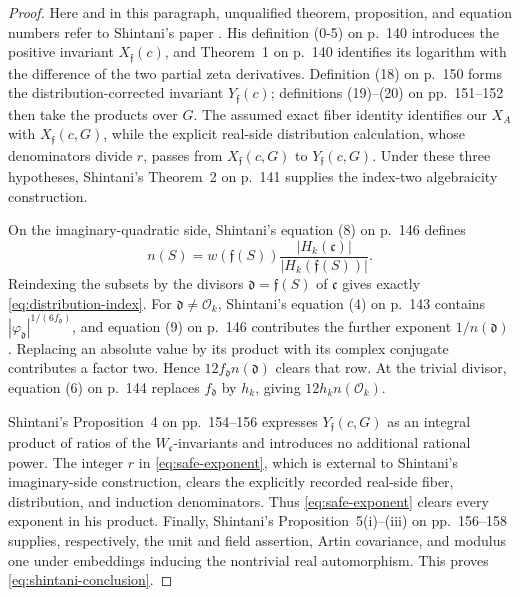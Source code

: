 \documentclass[11pt]{article}
\begin{document}
\begin{proof}
Here and in this paragraph, unqualified theorem, proposition, and
equation numbers refer to Shintani's paper \cite{Shintani1978}.
His definition (0-5) on p.~140 introduces the positive invariant
\(X_{\mathfrak f}(c)\), and Theorem~1 on p.~140 identifies its
logarithm with the difference of the two partial zeta derivatives.
Definition (18) on p.~150 forms the distribution-corrected invariant
\(Y_{\mathfrak f}(c)\); definitions (19)--(20) on pp.~151--152 then
take the products over \(G\).  The assumed exact fiber identity
identifies our \(X_A\) with \(X_{\mathfrak f}(c,G)\), while the
explicit real-side distribution calculation, whose denominators
divide \(r\), passes from \(X_{\mathfrak f}(c,G)\) to
\(Y_{\mathfrak f}(c,G)\).  Under these three hypotheses,
Shintani's Theorem~2 on p.~141 supplies the index-two algebraicity
construction.

On the imaginary-quadratic side, Shintani's equation (8) on p.~146
defines
\[
 n(S)=w(\mathfrak f(S))
 \frac{|H_k(\mathfrak c)|}{|H_k(\mathfrak f(S))|}.
\]
Reindexing the subsets by the divisors
\(\mathfrak d=\mathfrak f(S)\) of \(\mathfrak c\) gives exactly
\eqref{eq:distribution-index}.  For
\(\mathfrak d\ne\mathcal O_k\), Shintani's equation (4) on p.~143
contains
\(|\varphi_{\mathfrak d}|^{1/(6f_{\mathfrak d})}\), and equation
(9) on p.~146 contributes the further exponent
\(1/n(\mathfrak d)\).  Replacing an absolute value by its product
with its complex conjugate contributes a factor two.  Hence
\(12f_{\mathfrak d}n(\mathfrak d)\) clears that row.  At the trivial
divisor, equation (6) on p.~144 replaces
\(f_{\mathfrak d}\) by \(h_k\), giving
\(12h_kn(\mathcal O_k)\).

Shintani's Proposition~4 on pp.~154--156 expresses
\(Y_{\mathfrak f}(c,G)\) as an integral product of ratios of the
\(W_{\mathfrak c}\)-invariants and introduces no additional rational
power.  The integer \(r\) in \eqref{eq:safe-exponent}, which is
external to Shintani's
imaginary-side construction, clears the explicitly recorded
real-side fiber, distribution, and induction denominators.  Thus
\eqref{eq:safe-exponent} clears every exponent in his product.
Finally, Shintani's
Proposition~5(i)--(iii) on pp.~156--158 supplies, respectively, the
unit and field assertion, Artin covariance, and modulus one under
embeddings inducing the nontrivial real automorphism.  This proves
\eqref{eq:shintani-conclusion}.
\end{proof}
\end{document}
